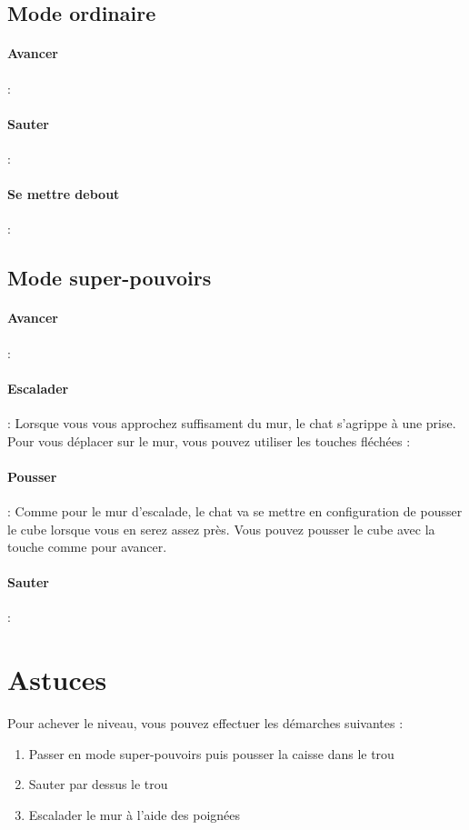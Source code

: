 \documentclass[a4paper,11pt]{article}
\begin{document}
\subsection{Mode ordinaire}
\paragraph{Avancer }: \fbox{$\rightarrow$}

\paragraph{Sauter} : 

\paragraph{Se mettre debout} : 
\subsection{Mode super-pouvoirs}
\paragraph{Avancer} : \fbox{$\rightarrow$}

\paragraph{Escalader} : Lorsque vous vous approchez suffisament du mur, le chat s'agrippe à une prise. Pour vous déplacer sur le mur, vous pouvez utiliser les touches fléchées : \fbox{$\uparrow$} \fbox{$\rightarrow$} \fbox{$\downarrow$} \fbox{$\leftarrow$}

\paragraph{Pousser} : Comme pour le mur d'escalade, le chat va se mettre en configuration de pousser le cube lorsque vous en serez assez près. Vous pouvez pousser le cube avec la touche \fbox{$\rightarrow$} comme pour avancer.

\paragraph{Sauter} : 



\section{Astuces}
Pour achever le niveau, vous pouvez effectuer les démarches suivantes : 
\begin{enumerate}
\item Passer en mode super-pouvoirs puis pousser la caisse dans le trou
\item Sauter par dessus le trou
\item Escalader le mur à l'aide des poignées
\end{enumerate}
\end{document}
